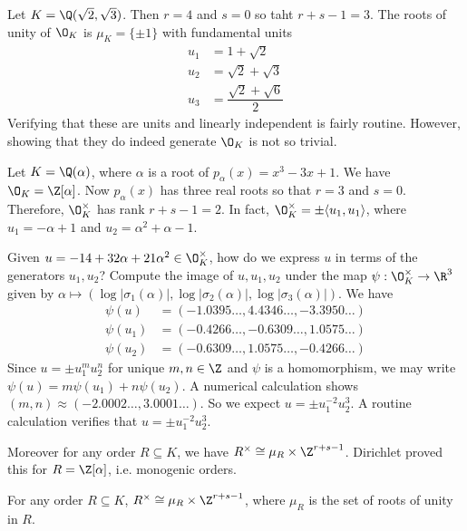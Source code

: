\begin{ex}
Let $K=\Q(\sqrt{2},\sqrt{3})$. Then $r=4$ and $s=0$ so taht $r+s-1=3$. The roots of unity of $\O_K$ is $\mu_K=\{ \pm1\}$ with fundamental units
	\[
	\begin{split}
	u_1&= 1+\sqrt{2} \\
	u_2&= \sqrt{2} + \sqrt{3} \\
	u_3&= \dfrac{\sqrt{2}+\sqrt{6}}{2}
	\end{split}
	\]
Verifying that these are units and linearly independent is fairly routine. However, showing that they do indeed generate $\O_K$ is not so trivial. \xqed
\end{ex}


\begin{ex}
Let $K=\Q(\alpha)$, where $\alpha$ is a root of $p_\alpha(x)=x^3-3x+1$. We have $\O_K=\Z[\alpha]$. Now $p_\alpha(x)$ has three real roots so that $r=3$ and $s=0$. Therefore, $\O_K^\times$ has rank $r+s-1=2$. In fact, $\O_K^\times= \pm \langle u_1,u_1 \rangle$, where $u_1= -\alpha+1$ and $u_2=\alpha^2+\alpha-1$.

Given $u= -14+32\alpha+21\alpha^2 \in \O_K^\times$, how do we express $u$ in terms of the generators $u_1,u_2$? Compute the image of $u,u_1,u_2$ under the map $\psi: \O_K^\times \to \R^3$ given by $\alpha \mapsto (\log|\sigma_1(\alpha)|, \log|\sigma_2(\alpha)|, \log|\sigma_3(\alpha)|)$. We have
	\[
	\begin{split}
	\psi(u)&= (-1.0395\ldots, 4.4346\ldots, -3.3950\ldots) \\
	\psi(u_1)&= (-0.4266\ldots, -0.6309\ldots, 1.0575\ldots) \\
	\psi(u_2)&= (-0.6309\ldots, 1.0575\ldots, -0.4266\ldots)
	\end{split}
	\]
Since $u= \pm u_1^mu_2^n$ for unique $m,n \in \Z$ and $\psi$ is a homomorphism, we may write $\psi(u)= m\psi(u_1) + n \psi(u_2)$. A numerical calculation shows $(m,n) \approx (-2.0002\ldots, 3.0001\ldots)$. So we expect $u= \pm u_1^{-2}u_2^3$. A routine calculation verifies that $u= \pm u_1^{-2}u_2^3$. \xqed
\end{ex}



Moreover for any order $R \subseteq K$, we have $R^\times \cong \mu_R \times \Z^{r+s-1}$. Dirichlet proved this for $R=\Z[\alpha]$, i.e. monogenic orders. 

\begin{prop} \label{prop:unitorder}
For any order $R \subseteq K$, $R^\times \cong \mu_R \times \Z^{r+s-1}$, where $\mu_R$ is the set of roots of unity in $R$. 
\end{prop}


